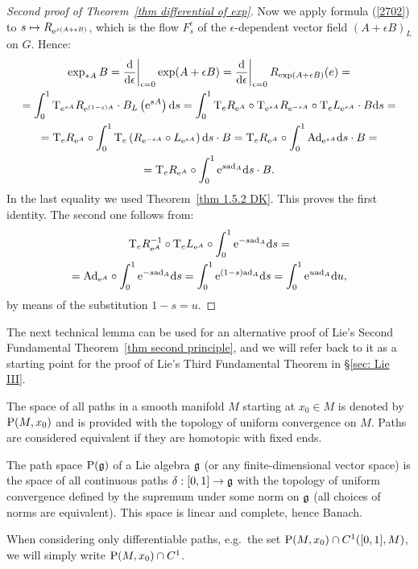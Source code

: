 \begin{proof}[Second proof of Theorem~\ref{thm differential of exp}]
    Now we apply formula (\ref{2702}) to $s\mapsto R_{\mathrm{e}^{s(A+\epsilon B)}}$, which is the flow $F^\epsilon_s$ of the $\epsilon$-dependent vector field $(A+\epsilon B)_L$ on $G$. Hence:
    \begin{multline}
        \exp_{\ast A}B=\restr{\frac{\dd}{\dd \epsilon}}{\epsilon=0}\exp(A+\epsilon B)=\restr{\frac{\dd}{\dd \epsilon}}{\epsilon=0}R_{\exp(A+\epsilon B)}(e)=\\
        =\int_0^1\T_{\rme^{sA}}R_{\rme^{(1-s)A}}\cdot B_L\left(\rme^{sA}\right)\dd s=
        \int_0^1 \T_e R_{\rme^A}\circ \T_{\rme^{sA}}R_{\rme^{-sA}}\circ \T_e L_{\rme^{sA}}\cdot B \dd s=\\
        =\T_e R_{\rme^A}\circ\int_0^1 \T_e\left(R_{\rme^{-sA}}\circ L_{\rme^{sA}}\right)\dd s \cdot B=
        \T_e R_{\rme^A}\circ \int_0^1 \Ad_{\rme^{sA}}\dd s\cdot B=\\
        =\T_eR_{\rme^A}\circ \int_0^1 \rme^{s\ad_A}\dd s\cdot B.
    \end{multline}
    In the last equality we used Theorem~\ref{thm 1.5.2 DK}. This proves the first identity. The second one follows from:
    \begin{multline}
        \mathrm{T}_e R_{\mathrm{e}^A}^{-1}\circ \mathrm{T}_eL_{\mathrm{e}^A}\circ \int_0^1 \mathrm{e}^{-s\mathrm{ad}_A}{\mathrm{d}} s=\\
        =\mathrm{Ad}_{\mathrm{e}^A}\circ\int_0^1 \mathrm{e}^{-s\mathrm{ad}_A}{\mathrm{d}} s=\int_0^1 \mathrm{e}^{(1-s)\mathrm{ad}_A}{\mathrm{d}} s=\int_0^1 \mathrm{e}^{u\mathrm{ad}_A}{\mathrm{d}} u,
    \end{multline}
    by means of the substitution $1-s=u$.
\end{proof}

The next technical lemma can be used for an alternative proof of Lie's Second Fundamental Theorem~\ref{thm second principle}, and we will refer back to it as a starting point for the proof of Lie's Third Fundamental Theorem in \S\ref{sec: Lie III}.

\begin{defn}
    The space of all paths in a smooth manifold $M$ starting at $x_0\in M$ is denoted by $\mathrm{P}(M,x_0)$ and is provided with the topology of uniform convergence on $M$. Paths are considered equivalent if they are homotopic with fixed ends.

    The path space $\mathrm{P}(\mathfrak{g})$ of a Lie algebra $\mathfrak{g}$ (or any finite-dimensional vector space) is the space of all continuous paths $\delta:[0,1]\to \mathfrak{g}$ with the topology of uniform convergence defined by the supremum under some norm on $\mathfrak{g}$ (all choices of norms are equivalent). This space is linear and complete, hence Banach.

    When considering only differentiable paths, e.g.~the set $\mathrm{P}(M,x_0)\cap C^1([0,1],M)$, we will simply write $\mathrm{P}(M,x_0)\cap C^1$. 
\end{defn}


